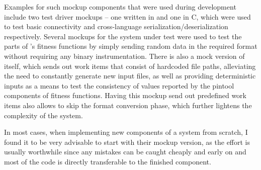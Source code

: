 Examples for such mockup components that were used during development include two test driver mockups -- one
written in \java and one in {\small C}, which were used to test basic \zmq connectivity and
cross-language \msgpack serialization/deserialization respectively. Several mockups for the system under test
were used to test the \java parts of \xmlmate's fitness functions by simply sending random data in the
required \msgpack format without requiring any binary instrumentation. There is also a mock version of
\xmlmate itself, which sends out work items that consist of hardcoded file paths, alleviating the need to
constantly generate new input files, as well as providing deterministic inputs as a means to test the
consistency of values reported by the pintool components of fitness functions. Having this mockup send out
predefined work items also allows to skip the format conversion phase, which further lightens the complexity
of the system.

In most cases, when implementing new components of a system from scratch, I found it to be very advisable to
start with their mockup version, as the effort is usually worthwhile since any mistakes can be caught
cheaply and early on and most of the code is directly transferable to the finished component.
\FloatBarrier